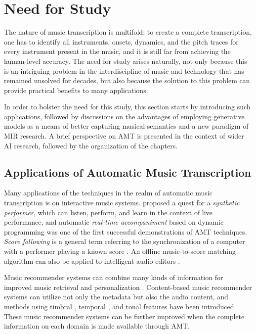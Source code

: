 \pagebreak

\section{Need for Study}

The nature of music transcription is multifold; to create a complete transcription, one has to identify all instruments, onsets, dynamics, and the pitch traces for every instrument present in the music, and it is still far from achieving the human-level accuracy.
The need for study arises naturally, not only because this is an intriguing problem in the interdiscipline of music and technology that has remained unsolved for decades, but also because the solution to this problem can provide practical benefits to many applications.

In order to bolster the need for this study, this section starts by introducing such applications, followed by discussions on the advantages of employing generative models as a means of better capturing musical semantics and a new paradigm of MIR research.
A brief perspective on AMT is presented in the context of wider AI research, followed by the organization of the chapters.


\subsection{Applications of Automatic Music Transcription}\label{sec:applications}

Many applications of the techniques in the realm of automatic music transcription is on interactive music systems.
 proposed a quest for a \emph{synthetic performer}, which can listen, perform, and learn in the context of live performance, and automatic \emph{real-time accompaniment} \cite{dannenberg1985accompaniment} based on dynamic programming was one of the first successful demonstrations of AMT techniques.
\emph{Score following} is a general term referring to the synchronization of a computer with a performer playing a known score \cite{orio2003following}.
An offline music-to-score matching algorithm can also be applied to intelligent audio editors \cite{dannenberg2003following}.

Music recommender systems can combine many kinds of information for improved music retrieval and personalization \cite{celma2010music}.
Content-based music recommender systems can utilize not only the metadata but also the audio content, and methods using timbral \cite{magno2008recommendation}, temporal \cite{li2007recommender}, and tonal features \cite{lu2009recommendation} have been introduced.
These music recommender systems can be further improved when the complete information on each domain is made available through AMT.

